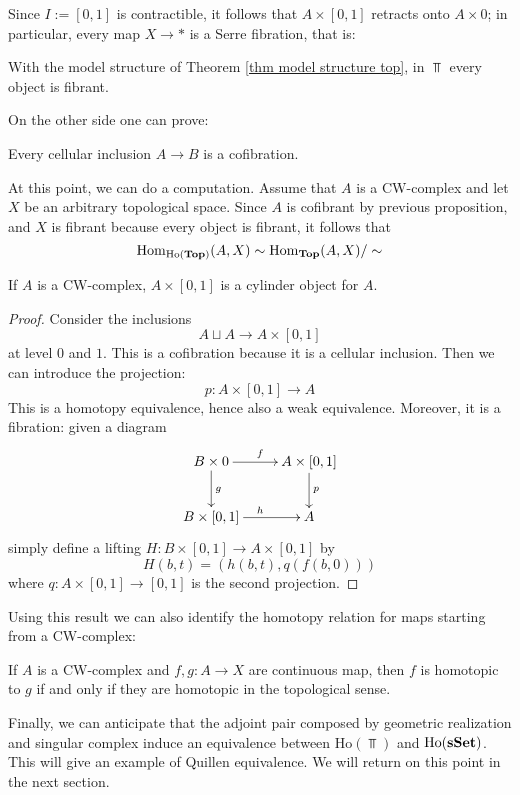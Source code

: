 \begin{refsection}
Since $I := [0,1]$ is contractible, it follows that $A \times [0,1]$ retracts onto $A \times 0$; in particular, every map $X \to *$ is a Serre fibration, that is:

\begin{cor}
With the model structure of Theorem \ref{thm model structure top}, in $\Top$ every object is fibrant.
\end{cor}

On the other side one can prove:

\begin{lemma}
Every cellular inclusion $A \to B$ is a cofibration.
\end{lemma}

At this point, we can do a computation. Assume that $A$ is a CW-complex and let $X$ be an arbitrary topological space. Since $A$ is cofibrant by previous proposition, and $X$ is fibrant because every object is fibrant, it follows that
\[
\mathrm{Hom}_{\mathrm{Ho}(\mathbf{Top})}(A,X) \sim \mathrm{Hom}_{\mathbf{Top}}(A,X) / \sim
\]

\begin{prop}
If $A$ is a CW-complex, $A \times [0,1]$ is a cylinder object for $A$.
\end{prop}

\begin{proof}
Consider the inclusions
\[
A \sqcup A \to A \times [0,1]
\]
at level $0$ and $1$. This is a cofibration because it is a cellular inclusion. Then we can introduce the projection:
\[
p \colon A \times [0,1] \to A
\]
This is a homotopy equivalence, hence also a weak equivalence. Moreover, it is a fibration: given a diagram
\[
\xymatrix{
B \times 0 \ar[d]^g \ar[r]^f & A \times [0,1] \ar[d]^p \\ B \times [0,1] \ar[r]^h & A
}
\]
simply define a lifting $H \colon B \times [0,1] \to A \times [0,1]$ by
\[
H(b,t) = (h(b,t),q(f(b,0)))
\]
where $q \colon A \times [0,1] \to [0,1]$ is the second projection.
\end{proof}

Using this result we can also identify the homotopy relation for maps starting from a CW-complex:

\begin{prop}
If $A$ is a CW-complex and $f,g \colon A \to X$ are continuous map, then $f$ is homotopic to $g$ if and only if they are homotopic in the topological sense.
\end{prop}

Finally, we can anticipate that the adjoint pair composed by geometric realization and singular complex induce an equivalence between $\mathrm{Ho}(\Top)$ and $\mathrm{Ho}(\mathbf{sSet})$. This will give an example of Quillen equivalence. We will return on this point in the next section.


\end{refsection}
